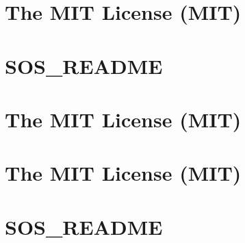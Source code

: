 \documentclass[twoside]{book}
\newcommand{\+}{\discretionary{\mbox{\scriptsize$\hookleftarrow$}}{}{}}
\begin{document}
\chapter{The MIT License (MIT)}
\label{md__d___source_shev4enkoyar__digital_twin__web_client_obj__release_netcoreapp3_1__pub_tmp__out_w1e3c183f5e46e2fe0715bd18b100cb18}

\chapter{SOS\+\_\+\+README}
\label{md__d___source_shev4enkoyar__digital_twin__web_client_obj__release_netcoreapp3_1_win_x64__pub_tmp__out__s_o_s__r_e_a_d_m_e}

\chapter{The MIT License (MIT)}
\label{md__d___source_shev4enkoyar__digital_twin__web_client_obj__release_netcoreapp3_1_win_x64__pub_tmc7cbdcd7ee8655db9921b26fa81d331a}

\chapter{The MIT License (MIT)}
\label{md__d___source_shev4enkoyar__digital_twin__web_client_obj__release_netcoreapp3_1_win_x64__pub_tm6cbffed88ad531b4ed4056f0ddb55914}

\chapter{SOS\+\_\+\+README}
\label{md__d___source_shev4enkoyar__digital_twin__web_client_obj__release_netcoreapp3_1_win_x86__pub_tmp__out__s_o_s__r_e_a_d_m_e}

\end{document}
